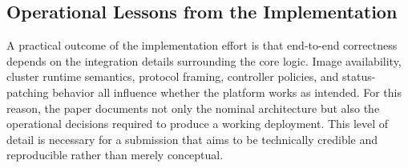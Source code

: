 \subsection{Operational Lessons from the Implementation}
A practical outcome of the implementation effort is that end-to-end correctness depends on the integration details surrounding the core logic. Image availability, cluster runtime semantics, protocol framing, controller policies, and status-patching behavior all influence whether the platform works as intended. For this reason, the paper documents not only the nominal architecture but also the operational decisions required to produce a working deployment. This level of detail is necessary for a submission that aims to be technically credible and reproducible rather than merely conceptual.
